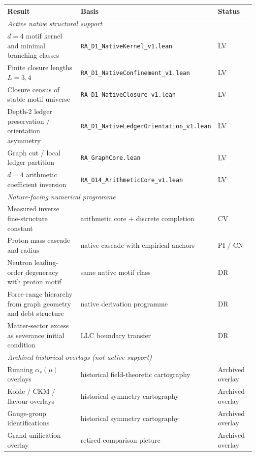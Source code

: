 \documentclass[11pt]{article}
\begin{document}
\begin{center}
\small
\begin{tabular}{lll}
\toprule
Result & Basis & Status \\
\midrule
\multicolumn{3}{l}{\textit{Active native structural support}} \\
$d=4$ motif kernel and minimal branching classes & \texttt{RA\_D1\_NativeKernel\_v1.lean} & LV \\
Finite closure lengths $L=3,4$ & \texttt{RA\_D1\_NativeConfinement\_v1.lean} & LV \\
Closure census of stable motif universe & \texttt{RA\_D1\_NativeClosure\_v1.lean} & LV \\
Depth-2 ledger preservation / orientation asymmetry & \texttt{RA\_D1\_NativeLedgerOrientation\_v1.lean} & LV \\
Graph cut / local ledger partition & \texttt{RA\_GraphCore.lean} & LV \\
$d=4$ arithmetic coefficient inversion & \texttt{RA\_O14\_ArithmeticCore\_v1.lean} & LV \\
\midrule
\multicolumn{3}{l}{\textit{Nature-facing numerical programme}} \\
Measured inverse fine-structure constant & arithmetic core + discrete completion & CV \\
Proton mass cascade and radius & native cascade with empirical anchors & PI / CN \\
Neutron leading-order degeneracy with proton motif & same native motif class & DR \\
Force-range hierarchy from graph geometry and debt structure & native derivation programme & DR \\
Matter-sector excess as severance initial condition & LLC boundary transfer & DR \\
\midrule
\multicolumn{3}{l}{\textit{Archived historical overlays (not active support)}} \\
Running $\alpha_s(\mu)$ overlays & historical field-theoretic cartography & Archived overlay \\
Koide / CKM / flavour overlays & historical symmetry cartography & Archived overlay \\
Gauge-group identifications & historical symmetry cartography & Archived overlay \\
Grand-unification overlay & retired comparison picture & Archived overlay \\
\bottomrule
\end{tabular}
\end{center}
\end{document}
